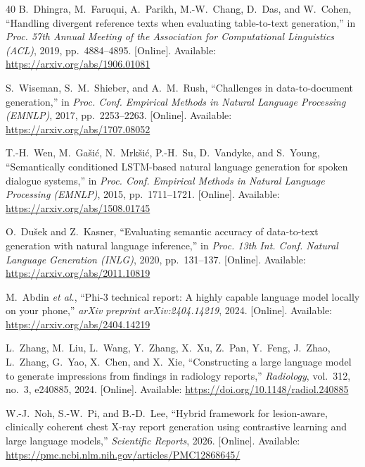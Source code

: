 \documentclass[conference, letterpaper]{IEEEtran}
\begin{document}
\begin{thebibliography}{40}
B.~Dhingra, M.~Faruqui, A.~Parikh, M.-W.~Chang, D.~Das, and W.~Cohen, ``Handling divergent reference texts when evaluating table-to-text generation,'' in \textit{Proc. 57th Annual Meeting of the Association for Computational Linguistics (ACL)}, 2019, pp.~4884--4895. [Online]. Available: \url{https://arxiv.org/abs/1906.01081}

S.~Wiseman, S.~M.~Shieber, and A.~M.~Rush, ``Challenges in data-to-document generation,'' in \textit{Proc. Conf. Empirical Methods in Natural Language Processing (EMNLP)}, 2017, pp.~2253--2263. [Online]. Available: \url{https://arxiv.org/abs/1707.08052}

T.-H.~Wen, M.~Ga\v{s}i\'{c}, N.~Mrk\v{s}i\'{c}, P.-H.~Su, D.~Vandyke, and S.~Young, ``Semantically conditioned LSTM-based natural language generation for spoken dialogue systems,'' in \textit{Proc. Conf. Empirical Methods in Natural Language Processing (EMNLP)}, 2015, pp.~1711--1721. [Online]. Available: \url{https://arxiv.org/abs/1508.01745}

O.~Du\v{s}ek and Z.~Kasner, ``Evaluating semantic accuracy of data-to-text generation with natural language inference,'' in \textit{Proc. 13th Int. Conf. Natural Language Generation (INLG)}, 2020, pp.~131--137. [Online]. Available: \url{https://arxiv.org/abs/2011.10819}

M.~Abdin \textit{et al.}, ``Phi-3 technical report: A highly capable language model locally on your phone,'' \textit{arXiv preprint arXiv:2404.14219}, 2024. [Online]. Available: \url{https://arxiv.org/abs/2404.14219}

L.~Zhang, M.~Liu, L.~Wang, Y.~Zhang, X.~Xu, Z.~Pan, Y.~Feng, J.~Zhao, L.~Zhang, G.~Yao, X.~Chen, and X.~Xie, ``Constructing a large language model to generate impressions from findings in radiology reports,'' \textit{Radiology}, vol.~312, no.~3, e240885, 2024. [Online]. Available: \url{https://doi.org/10.1148/radiol.240885}

W.-J.~Noh, S.-W.~Pi, and B.-D.~Lee, ``Hybrid framework for lesion-aware, clinically coherent chest X-ray report generation using contrastive learning and large language models,'' \textit{Scientific Reports}, 2026. [Online]. Available: \url{https://pmc.ncbi.nlm.nih.gov/articles/PMC12868645/}

\end{thebibliography}
\end{document}
